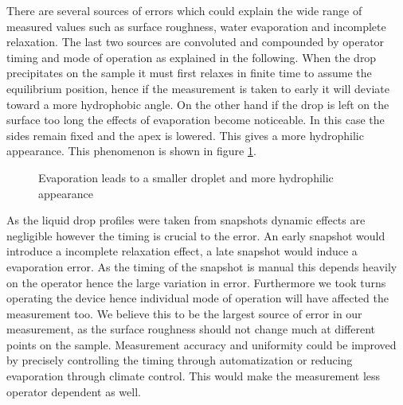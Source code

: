 There are several sources of errors which could explain the wide range of measured values such as surface roughness, water evaporation and incomplete relaxation. The last two sources are convoluted and compounded by operator timing and mode of operation as explained in the following.
When the drop precipitates on the sample it must first relaxes in finite time to assume the equilibrium position, hence if the measurement is taken to early it will deviate toward a more hydrophobic angle.
On the other hand if the drop is left on the surface too long the effects of evaporation become noticeable. In this case the sides remain fixed and the apex is lowered. This gives a more hydrophilic appearance. This phenomenon is shown in figure \ref{fig:evaporation}.

\begin{figure}
\centering

\caption{Evaporation leads to a smaller droplet and more hydrophilic appearance}
\label{fig:evaporation}
\end{figure}

As the liquid drop profiles were taken from snapshots dynamic effects are negligible however the timing is crucial to the error. An early snapshot would introduce a incomplete relaxation effect, a late snapshot would induce a evaporation error. As the timing of the snapshot is manual this depends heavily on the operator hence the large variation in error. Furthermore we took turns operating the device hence individual mode of operation will have affected the measurement too.
We believe this to be the largest source of error in our measurement, as the surface roughness should not change much at different points on the sample. Measurement accuracy and uniformity could be improved by precisely controlling the timing through automatization or reducing evaporation through climate control. This would make the measurement less operator dependent as well.
